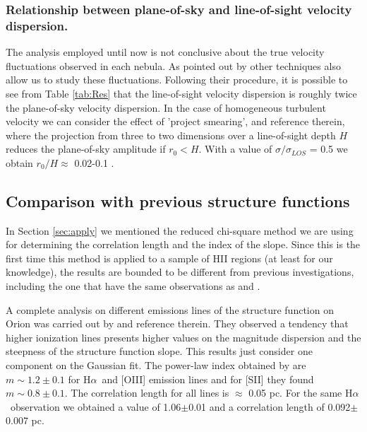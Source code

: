 \documentclass[fleqn,usenatbib, useAMS, a4paper]{mnras}
\newcommand\halpha{H${\alpha}$}
\begin{document}
\subsubsection{Relationship between plane-of-sky and line-of-sight velocity dispersion.}

The analysis employed until now is not conclusive about the true velocity fluctuations observed in each nebula. 
As pointed out by \citet{arthur2016turbulence} other techniques also allow us to study these fluctuations. 
Following their procedure, it is possible to see from Table \ref{tab:Res} that the line-of-sight velocity dispersion is roughly twice the plane-of-sky velocity dispersion.
In the case of homogeneous turbulent velocity we can consider the effect of 'project smearing', \citet{arthur2016turbulence} and reference therein, where the projection from three to two dimensions over a line-of-sight depth \(H\) reduces the plane-of-sky amplitude if \(r_{0} < H\).
With a value of \(\sigma / \sigma_{LOS}\) = 0.5 we obtain \(r_{0} / H \approx\) 0.02-0.1 \citep{1984ApJ...277..556S}.

\subsection{Comparison with previous structure functions}

In Section \ref{sec:apply} we mentioned the reduced chi-square method we are using for determining the correlation length and the index of the slope. Since this is the first time this method is applied to a sample of HII regions (at least for our knowledge), the results are bounded to be different from previous investigations, including the one that have the same observations as \citet{arthur2016turbulence} and \citet{2019arXiv191203543M}. 

A complete analysis on different emissions lines of the structure function on Orion was carried out by \citet{arthur2016turbulence} and reference therein. 
They observed a tendency that higher ionization lines presents higher values on the magnitude dispersion and the steepness of the structure function slope. 
This results just consider one component on the Gaussian fit. 
The power-law index obtained by \citet{arthur2016turbulence} are \(m \sim 1.2 \pm 0.1\) for \halpha\ and [OIII] emission lines and for [SII] they found \(m \sim 0.8 \pm 0.1\). 
The correlation length for all lines is \(\approx\) 0.05 pc. For the same \halpha\ observation we obtained a value of 1.06$\pm$0.01 and a correlation length of 0.092$\pm$0.007 pc. 
\end{document}
